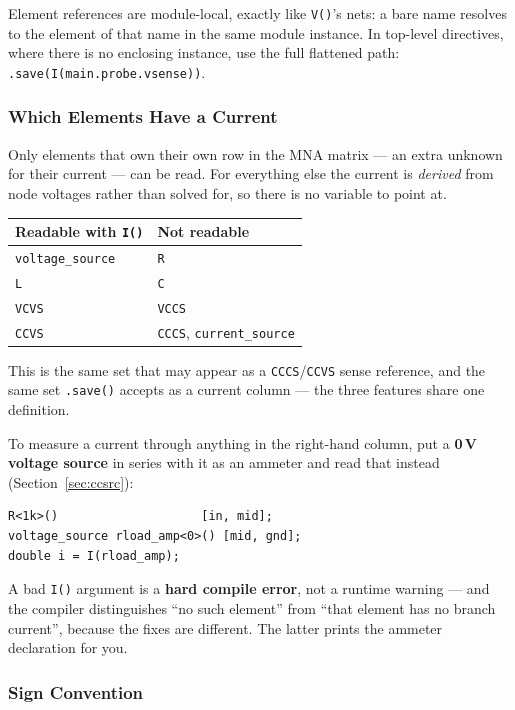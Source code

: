 \documentclass[11pt, a4paper]{article}
\newcommand{\code}[1]{\texttt{\small #1}}
\begin{document}
Element references are module-local, exactly like \code{V()}'s nets: a bare
name resolves to the element of that name in the same module instance. In
top-level directives, where there is no enclosing instance, use the full
flattened path: \code{.save(I(main.probe.vsense))}.

\subsubsection{Which Elements Have a Current}

Only elements that own their own row in the MNA matrix --- an extra unknown for
their current --- can be read. For everything else the current is
\textit{derived} from node voltages rather than solved for, so there is no
variable to point at.

\begin{center}
\begin{tabular}{@{} L{6cm} L{7cm} @{}}
  \toprule
  \textbf{Readable with \code{I()}} & \textbf{Not readable} \\
  \midrule
  \code{voltage\_source} & \code{R} \\
  \code{L} & \code{C} \\
  \code{VCVS} & \code{VCCS} \\
  \code{CCVS} & \code{CCCS}, \code{current\_source} \\
  \bottomrule
\end{tabular}
\end{center}

This is the same set that may appear as a \code{CCCS}/\code{CCVS} sense
reference, and the same set \code{.save()} accepts as a current column --- the
three features share one definition.

To measure a current through anything in the right-hand column, put a
\textbf{0\,V voltage source} in series with it as an ammeter and read that
instead (Section~\ref{sec:ccsrc}):

\begin{lstlisting}
R<1k>()                    [in, mid];
voltage_source rload_amp<0>() [mid, gnd];
double i = I(rload_amp);
\end{lstlisting}

A bad \code{I()} argument is a \textbf{hard compile error}, not a runtime
warning --- and the compiler distinguishes ``no such element'' from ``that
element has no branch current'', because the fixes are different. The latter
prints the ammeter declaration for you.

\subsubsection{Sign Convention}
\end{document}

